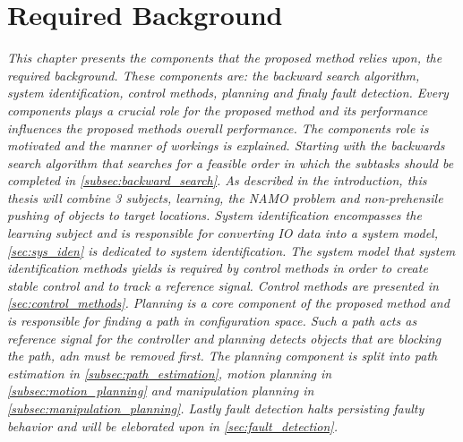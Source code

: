 \chapter{Required Background}%
\label{chap:required_background}
\textit{This chapter presents the components that the proposed method relies upon, the required background. These components are: the backward search algorithm, system identification, control methods, planning and finaly fault detection. Every components plays a crucial role for the proposed method and its performance influences the proposed methods overall performance. The components role is motivated and the manner of workings is explained. Starting with the backwards search algorithm that searches for a feasible order in which the subtasks should be completed in \cref{subsec:backward_search}. As described in the introduction, this thesis will combine 3 subjects, learning, the \ac{NAMO} problem and non-prehensile pushing of objects to target locations. System identification encompasses the learning subject and is responsible for converting \ac{IO} data into a system model, \cref{sec:sys_iden} is dedicated to system identification. The system model that system identification methods yields is required by control methods in order to create stable control and to track a reference signal. Control methods are presented in \cref{sec:control_methods}. Planning is a core component of the proposed method and is responsible for finding a path in configuration space. Such a path acts as reference signal for the controller and planning detects objects that are blocking the path, adn must be removed first. The planning component is split into path estimation in \cref{subsec:path_estimation}, motion planning in \cref{subsec:motion_planning} and manipulation planning in \cref{subsec:manipulation_planning}. Lastly fault detection halts persisting faulty behavior and will be eleborated upon in \cref{sec:fault_detection}.\bs}











